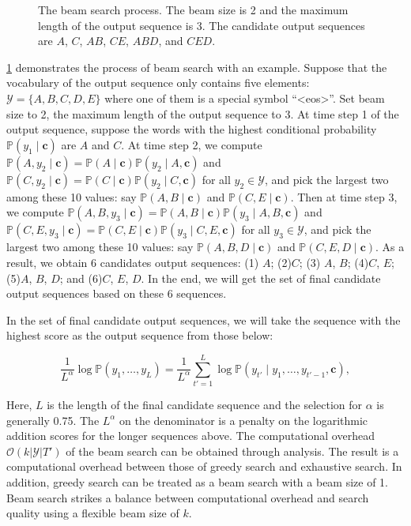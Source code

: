 \begin{figure}[hpt]
	\centering
	
	\caption{The beam search process. The beam size is 2 and the maximum length of the output sequence is 3. The candidate output sequences are $A$, $C$, $AB$, $CE$, $ABD$, and $CED$. }
	\label{fig:beam_search}
\end{figure}

\cref{fig:beam_search} demonstrates the process of beam search with an example. Suppose that the vocabulary of the output sequence only contains five elements: $\mathcal{Y} = \{A, B, C, D, E\}$ where one of them is a special symbol “<eos>”. Set beam size to 2, the maximum length of the output sequence to 3. At time step 1 of the output sequence, suppose the words with the highest conditional probability $\mathbb{P}(y_1 \mid \boldsymbol{c})$ are $A$ and $C$. At time step 2, we compute $\mathbb{P}(A, y_2 \mid \boldsymbol{c}) = \mathbb{P}(A \mid \boldsymbol{c})\mathbb{P}(y_2 \mid A, \boldsymbol{c})$ and $\mathbb{P}(C, y_2 \mid \boldsymbol{c}) = \mathbb{P}(C \mid \boldsymbol{c})\mathbb{P}(y_2 \mid C, \boldsymbol{c})$ for all $y_2 \in \mathcal{Y}$, and pick the largest two among these 10 values: say $\mathbb{P}(A, B \mid \boldsymbol{c})$ and $\mathbb{P}(C, E \mid \boldsymbol{c})$. Then at time step 3, we compute $\mathbb{P}(A, B, y_3 \mid \boldsymbol{c}) = \mathbb{P}(A, B \mid \boldsymbol{c})\mathbb{P}(y_3 \mid A, B, \boldsymbol{c})$ and $\mathbb{P}(C, E, y_3 \mid \boldsymbol{c}) = \mathbb{P}(C, E \mid \boldsymbol{c})\mathbb{P}(y_3 \mid C, E, \boldsymbol{c})$ for all $y_3 \in \mathcal{Y}$, and pick the largest two among these 10 values: say $\mathbb{P}(A, B, D \mid \boldsymbol{c})$ and $\mathbb{P}(C, E, D \mid  \boldsymbol{c})$. As a result, we obtain 6 candidates output sequences: (1) $A$; (2)$C$; (3) $A$, $B$; (4)$C$, $E$; (5)$A$, $B$, $D$; and (6)$C$, $E$, $D$. In the end, we will get the set of final candidate output sequences based on these 6 sequences.

In the set of final candidate output sequences, we will take the sequence with the highest score as the output sequence from those below:

$$ \frac{1}{L^\alpha} \log \mathbb{P}(y_1, \ldots, y_{L}) = \frac{1}{L^\alpha} \sum_{t'=1}^L \log \mathbb{P}(y_{t'} \mid y_1, \ldots, y_{t'-1}, \boldsymbol{c}),$$

Here, $L$ is the length of the final candidate sequence and the selection for $\alpha$ is generally 0.75. The $L^\alpha$ on the denominator is a penalty on the logarithmic addition scores for the longer sequences above. The computational overhead $\mathcal{O}(k\left|\mathcal{Y}\right|T')$ of the beam search can be obtained through analysis. The result is a computational overhead between those of greedy search and exhaustive search. In addition, greedy search can be treated as a beam search with a beam size of 1. Beam search strikes a balance between computational overhead and search quality using a flexible beam size of $k$.

